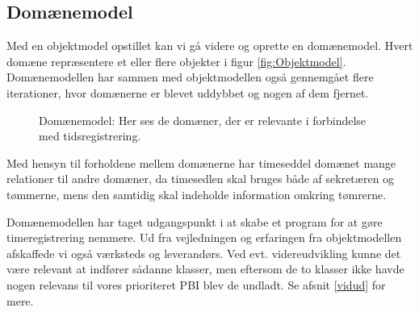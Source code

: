 \subsection{Domænemodel}

Med en objektmodel opstillet kan vi gå videre og oprette en domænemodel.
Hvert domæne repræsentere et eller flere objekter i figur \ref{fig:Objektmodel}.    
Domænemodellen har sammen med objektmodellen også gennemgået flere iterationer, hvor domænerne er blevet uddybbet og nogen af dem fjernet.

\begin{figure}[H]
    \caption{Domænemodel: Her ses de domæner, der er relevante i forbindelse med tidsregistrering.}
    \label{fig:DomaeneModelSprint2}
\end{figure} 

Med hensyn til forholdene mellem domænerne har timeseddel domænet mange relationer til andre domæner, da timesedlen skal bruges både af sekretæren og tømmerne, mens den samtidig skal indeholde information omkring tømrerne.

Domænemodellen har taget udgangspunkt i at skabe et program for at gøre timeregistrering nemmere. Ud fra vejledningen og erfaringen fra objektmodellen afskaffede vi også værksteds og leverandørs. Ved evt. videreudvikling kunne det være relevant at indfører sådanne klasser, men eftersom de to klasser ikke havde nogen relevans til vores prioriteret PBI blev de undladt. Se afsnit \ref{vidud} for mere.